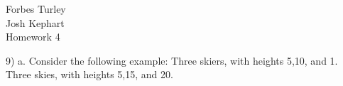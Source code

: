\documentclass[11pt]{article}
\begin{document}
\begin{flushright}
Forbes Turley\\
Josh Kephart\\
Homework 4
\end{flushright}
9) a. Consider the following example: Three skiers, with heights 5,10, and 1. Three skies, with
heights 5,15, and 20. 
\end{document}
